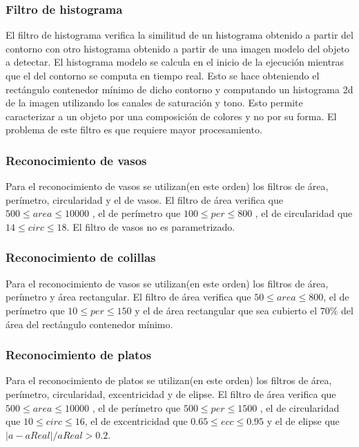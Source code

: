 	\subsubsection*{Filtro de histograma}
	El filtro de histograma verifica la similitud de un histograma obtenido a partir del contorno con otro histograma obtenido a partir de 
	una imagen modelo del objeto a detectar. El histograma modelo se calcula en el inicio de la ejecución mientras que el del contorno se
	computa en tiempo real. Esto se hace obteniendo el rectángulo contenedor mínimo de dicho contorno y computando un histograma 2d de la imagen
	utilizando los canales de saturación y tono. Esto permite caracterizar a un objeto por una composición de colores y no por su forma. El 
	problema de este filtro es que requiere mayor procesamiento.
	
	\subsubsection{Reconocimiento de vasos}
	Para el reconocimiento de vasos se utilizan(en este orden) los filtros de área, perímetro, circularidad y el de vasos.
	El filtro de área verifica que $500 \leq area \leq 10000 $ , el de perímetro que $100 \leq per \leq 800 $ , el de circularidad
	que $14 \leq circ \leq 18$. El filtro de vasos no es parametrizado. 
	
	\subsubsection{Reconocimiento de colillas}
	Para el reconocimiento de vasos se utilizan(en este orden) los filtros de área, perímetro y área rectangular.
	El filtro de área verifica que $50 \leq area \leq 800 $, el de perímetro que $10 \leq per \leq 150 $ y el de área rectangular
	que sea cubierto el $70\%$ del área del rectángulo contenedor mínimo.
	
	\subsubsection{Reconocimiento de platos}
	Para el reconocimiento de platos se utilizan(en este orden) los filtros de área, perímetro, circularidad, excentricidad y de elipse.
	El filtro de área verifica que $500 \leq area \leq 10000 $ , el de perímetro que $500 \leq per \leq 1500 $ , el de circularidad
	que $10 \leq circ \leq 16$, el de excentricidad que $0.65 \leq ecc \leq 0.95$ y  el de elipse que $|a-aReal|/ aReal > 0.2$.

